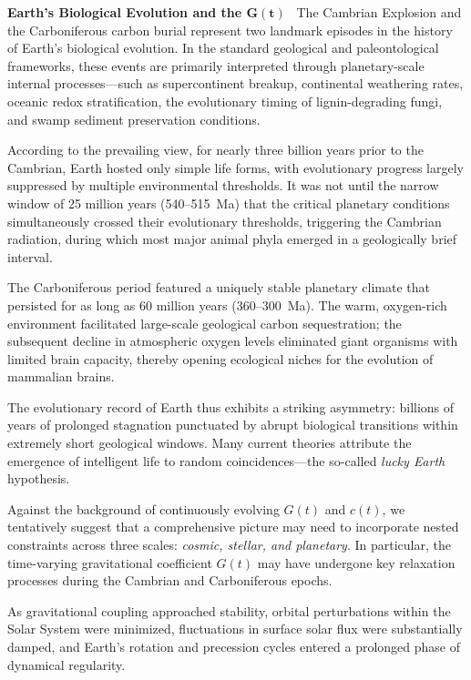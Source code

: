 \documentclass[12pt,leqno]{article}
\begin{document}
{	
	
	
	
	\medskip
	\bigskip
	\textbf{Earth's Biological Evolution and the $\boldsymbol{G(t)}$}\,\,\,
	The Cambrian Explosion and the Carboniferous carbon burial represent two landmark episodes in the history of Earth's biological evolution. In the standard geological and paleontological frameworks, these events are primarily interpreted through planetary-scale internal processes—such as supercontinent breakup, continental weathering rates, oceanic redox stratification, the evolutionary timing of lignin-degrading fungi, and swamp sediment preservation conditions.
	
	\medskip
	According to the prevailing view, for nearly three billion years prior to the Cambrian, Earth hosted only simple life forms, with evolutionary progress largely suppressed by multiple environmental thresholds. It was not until the narrow window of 25 million years (540--515~Ma) that the critical planetary conditions simultaneously crossed their evolutionary thresholds, triggering the Cambrian radiation, during which most major animal phyla emerged in a geologically brief interval.
	
	\medskip
	The Carboniferous period featured a uniquely stable planetary climate that persisted for as long as 60 million years (360--300~Ma). The warm, oxygen-rich environment facilitated large-scale geological carbon sequestration; the subsequent decline in atmospheric oxygen levels eliminated giant organisms with limited brain capacity, thereby opening ecological niches for the evolution of mammalian brains.
	
	\medskip
	The evolutionary record of Earth thus exhibits a striking asymmetry: billions of years of prolonged stagnation punctuated by abrupt biological transitions within extremely short geological windows. Many current theories attribute the emergence of intelligent life to random coincidences—the so-called \textit{lucky Earth} hypothesis.
	
	\medskip
	Against the background of continuously evolving $G(t)$ and $c(t)$, we tentatively suggest that a comprehensive picture may need to incorporate nested constraints across three scales: \textit{cosmic, stellar, and planetary}. In particular, the time-varying gravitational coefficient $G(t)$ may have undergone key relaxation processes during the Cambrian and Carboniferous epochs. 
	
	\medskip
	As gravitational coupling approached stability, orbital perturbations within the Solar System were minimized, fluctuations in surface solar flux were substantially damped, and Earth's rotation and precession cycles entered a prolonged phase of dynamical regularity.
	
}
\end{document}
